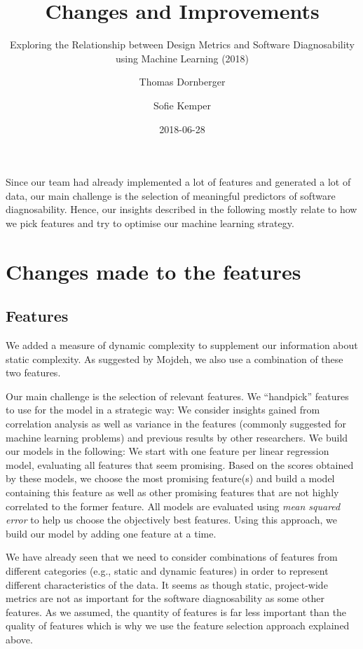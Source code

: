 \documentclass{scrartcl}
\begin{document}
\title{Changes and Improvements}
\subtitle{Exploring the Relationship between Design Metrics and Software
Diagnosability using Machine Learning (2018)}
\author{Thomas Dornberger \and Sofie Kemper}
\date{2018-06-28}

\maketitle

Since our team had already implemented a lot of features and generated a lot of
data, our main challenge is the selection of meaningful predictors of software
diagnosability. Hence, our insights described in the following mostly relate to
how we pick features and try to optimise our machine learning strategy.

\section{Changes made to the features}

\subsection{Features}

We added a measure of dynamic complexity to supplement our information about
static complexity. As suggested by Mojdeh, we also use a combination of these
two features.

Our main challenge is the selection of relevant features. We \enquote{handpick}
features to use for the model in a strategic way: We consider insights gained
from correlation analysis as well as variance in the features (commonly
suggested for machine learning problems) and previous results by other
researchers. We build our models in the following: We start with one feature per
linear regression model, evaluating all features that seem promising. Based on
the scores obtained by these models, we choose the most promising feature(s) and
build a model containing this feature as well as other promising features that
are not highly correlated to the former feature. All models are evaluated using
\emph{mean squared error} to help us choose the objectively best features. Using
this approach, we build our model by adding one feature at a time.

We have already seen that we need to consider combinations of features from
different categories (e.g., static and dynamic features) in order to represent
different characteristics of the data. It seems as though static, project-wide
metrics are not as important for the software diagnosability as some other
features. As we assumed, the quantity of features is far less important than the
quality of features which is why we use the feature selection approach explained
above.
\end{document}
